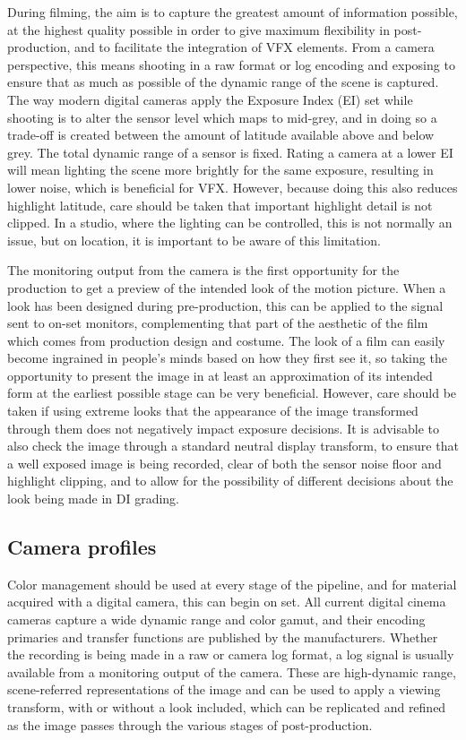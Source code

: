 During filming, the aim is to capture the greatest amount of information possible, at the highest quality possible in order to give maximum flexibility in post-production, and to facilitate the integration of VFX elements. From a camera perspective, this means shooting in a raw format or log encoding and exposing to ensure that as much as possible of the dynamic range of the scene is captured. The way modern digital cameras apply the Exposure Index (EI) set while shooting is to alter the sensor level which maps to mid-grey, and in doing so a trade-off is created between the amount of latitude available above and below grey. The total dynamic range of a sensor is fixed. Rating a camera at a lower EI will mean lighting the scene more brightly for the same exposure, resulting in lower noise, which is beneficial for VFX. However, because doing this also reduces highlight latitude, care should be taken that important highlight detail is not clipped. In a studio, where the lighting can be controlled, this is not normally an issue, but on location, it is important to be aware of this limitation.

The monitoring output from the camera is the first opportunity for the production to get a preview of the intended look of the motion picture. When a look has been designed during pre-production, this can be applied to the signal sent to on-set monitors, complementing that part of the aesthetic of the film which comes from production design and costume. The look of a film can easily become ingrained in people’s minds based on how they first see it, so taking the opportunity to present the image in at least an approximation of its intended form at the earliest possible stage can be very beneficial. However, care should be taken if using extreme looks that the appearance of the image transformed through them does not negatively impact exposure decisions. It is advisable to also check the image through a standard neutral display transform, to ensure that a well exposed image is being recorded, clear of both the sensor noise floor and highlight clipping, and to allow for the possibility of different decisions about the look being made in DI grading.



\subsection{Camera profiles}

Color management should be used at every stage of the pipeline, and for material acquired with a digital camera, this can begin on set. All current digital cinema cameras capture a wide dynamic range and color gamut, and their encoding primaries and transfer functions are published by the manufacturers. Whether the recording is being made in a raw or camera log format, a log signal is usually available from a monitoring output of the camera. These are high-dynamic range, scene-referred representations of the image and can be used to apply a viewing transform, with or without a look included, which can be replicated and refined as the image passes through the various stages of post-production.

